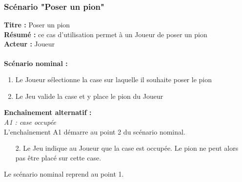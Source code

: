 \documentclass[12pt , a4paper]{article}
\begin{document}
\subsubsection{Scénario "Poser un pion"}
\noindent\textbf{Titre : } Poser un pion\\
\textbf{Résumé : } ce cas d'utilisation permet à un Joueur de poser un pion\\
\textbf{Acteur : } Joueur\\ \\
\textbf{Scénario nominal :}
\begin{enumerate}
\item Le Joueur sélectionne la case sur laquelle il souhaite poser le pion
\item Le Jeu valide la case et y place le pion du Joueur
\end{enumerate}
\textbf{Encha\^inement alternatif :}\\
\textit{A1 : case occupée}\\
L'encha\^inement A1 démarre au point 2 du scénario nominal.
\begin{enumerate}
\item[2.] Le Jeu indique au Joueur que la case est occupée. Le pion ne peut alors pas \^etre placé sur cette case.
\end{enumerate}
Le scénario nominal reprend au point 1.
\end{document}
